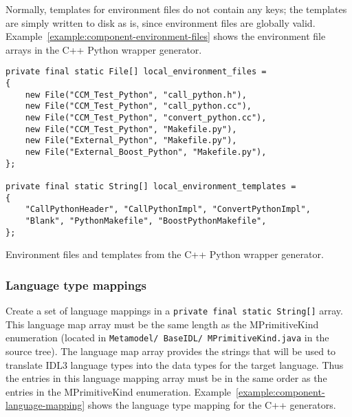 Normally, templates for environment files do not contain any keys; the templates
are simply written to disk as is, since environment files are globally valid.
Example~\ref{example:component-environment-files} shows the environment file
arrays in the C++ Python wrapper generator.

\begin{Example}
\begin{minifbox}
\begin{small}
\begin{verbatim}
private final static File[] local_environment_files =
{
    new File("CCM_Test_Python", "call_python.h"),
    new File("CCM_Test_Python", "call_python.cc"),
    new File("CCM_Test_Python", "convert_python.cc"),
    new File("CCM_Test_Python", "Makefile.py"),
    new File("External_Python", "Makefile.py"),
    new File("External_Boost_Python", "Makefile.py"),
};

private final static String[] local_environment_templates =
{
    "CallPythonHeader", "CallPythonImpl", "ConvertPythonImpl",
    "Blank", "PythonMakefile", "BoostPythonMakefile",
};
\end{verbatim}
\end{small}
\end{minifbox}
\caption{Environment files and templates from the C++ Python wrapper generator.}
\label{example:component-environment-files}
\end{Example}

\subsubsection{Language type mappings}

Create a set of language mappings in a {\tt private final static String[]}
array. This language map array must be the same length as the MPrimitiveKind
enumeration (located in {\tt Metamodel/ BaseIDL/ MPrimitiveKind.java} in the
source tree). The language map array provides the strings that will be used to
translate IDL3 language types into the data types for the target language. Thus
the entries in this language mapping array must be in the same order as the
entries in the MPrimitiveKind enumeration.
Example~\ref{example:component-language-mapping} shows the language type mapping
for the C++ generators.

